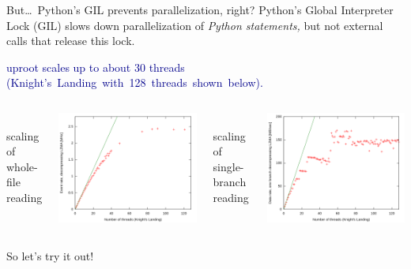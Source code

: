 \documentclass[aspectratio=169]{beamer}
\begin{document}
\begin{frame}{But\ldots\ Python's GIL prevents parallelization, right?}
\vspace{0.4 cm}
{\large Python's Global Interpreter Lock (GIL) slows down parallelization of {\it Python statements,} but not external calls that release this lock.}

\vspace{0.35 cm}
\textcolor{darkblue}{uproot scales up to about 30 threads \mbox{(Knight's Landing with 128 threads shown below).\hspace{-1 cm}}}

\vspace{0.35 cm}
\begin{columns}
\mbox{ } \hfill scaling of whole-file reading \hfill \mbox{ }

\vspace{0.2 cm}
\includegraphics[width=\linewidth]{uproot-scaling.png}

\mbox{ } \hfill scaling of single-branch reading \hfill \mbox{ }

\vspace{0.2 cm}
\includegraphics[width=\linewidth]{uproot-scaling-2.png}
\end{columns}
\end{frame}

\begin{frame}{}
\begin{center}
\LARGE So let's try it out!
\end{center}
\end{frame}
\end{document}
